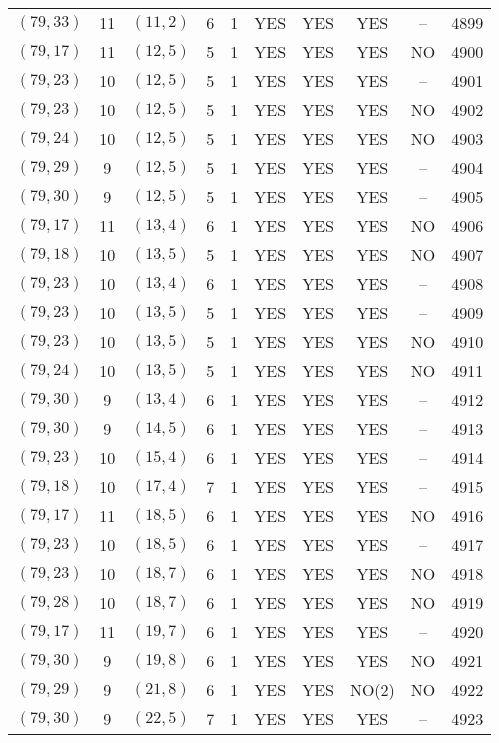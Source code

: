 \begin{longtable}{|c|c|c|c|c|c|c|c|c|c|}
$(79, 33)$ & 11 & $(11, 2)$ & 6 & 1 & YES & YES & YES & -- & 4899\\
$(79, 17)$ & 11 & $(12, 5)$ & 5 & 1 & YES & YES & YES & NO & 4900\\
$(79, 23)$ & 10 & $(12, 5)$ & 5 & 1 & YES & YES & YES & -- & 4901\\
$(79, 23)$ & 10 & $(12, 5)$ & 5 & 1 & YES & YES & YES & NO & 4902\\
$(79, 24)$ & 10 & $(12, 5)$ & 5 & 1 & YES & YES & YES & NO & 4903\\
$(79, 29)$ & 9 & $(12, 5)$ & 5 & 1 & YES & YES & YES & -- & 4904\\
$(79, 30)$ & 9 & $(12, 5)$ & 5 & 1 & YES & YES & YES & -- & 4905\\
$(79, 17)$ & 11 & $(13, 4)$ & 6 & 1 & YES & YES & YES & NO & 4906\\
$(79, 18)$ & 10 & $(13, 5)$ & 5 & 1 & YES & YES & YES & NO & 4907\\
$(79, 23)$ & 10 & $(13, 4)$ & 6 & 1 & YES & YES & YES & -- & 4908\\
$(79, 23)$ & 10 & $(13, 5)$ & 5 & 1 & YES & YES & YES & -- & 4909\\
$(79, 23)$ & 10 & $(13, 5)$ & 5 & 1 & YES & YES & YES & NO & 4910\\
$(79, 24)$ & 10 & $(13, 5)$ & 5 & 1 & YES & YES & YES & NO & 4911\\
$(79, 30)$ & 9 & $(13, 4)$ & 6 & 1 & YES & YES & YES & -- & 4912\\
$(79, 30)$ & 9 & $(14, 5)$ & 6 & 1 & YES & YES & YES & -- & 4913\\
$(79, 23)$ & 10 & $(15, 4)$ & 6 & 1 & YES & YES & YES & -- & 4914\\
$(79, 18)$ & 10 & $(17, 4)$ & 7 & 1 & YES & YES & YES & -- & 4915\\
$(79, 17)$ & 11 & $(18, 5)$ & 6 & 1 & YES & YES & YES & NO & 4916\\
$(79, 23)$ & 10 & $(18, 5)$ & 6 & 1 & YES & YES & YES & -- & 4917\\
$(79, 23)$ & 10 & $(18, 7)$ & 6 & 1 & YES & YES & YES & NO & 4918\\
$(79, 28)$ & 10 & $(18, 7)$ & 6 & 1 & YES & YES & YES & NO & 4919\\
$(79, 17)$ & 11 & $(19, 7)$ & 6 & 1 & YES & YES & YES & -- & 4920\\
$(79, 30)$ & 9 & $(19, 8)$ & 6 & 1 & YES & YES & YES & NO & 4921\\
$(79, 29)$ & 9 & $(21, 8)$ & 6 & 1 & YES & YES & NO(2) & NO & 4922\\
$(79, 30)$ & 9 & $(22, 5)$ & 7 & 1 & YES & YES & YES & -- & 4923\\

\end{longtable}
